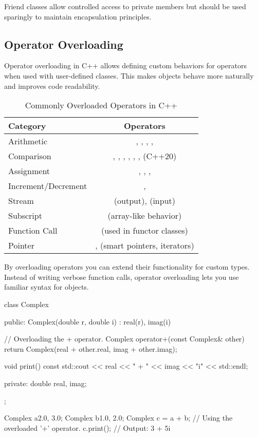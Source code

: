 Friend classes allow controlled access to private members but should be used sparingly to maintain encapsulation principles.


\subsection{Operator Overloading}

Operator overloading in C++ allows defining custom behaviors for operators when used with user-defined classes. This makes objects behave more naturally and improves code readability.

\begin{table}[H]
    \centering
    \setlength{\tabcolsep}{20pt}
    \begin{tabulary}{\linewidth}{@{} L C @{}}
        \toprule
        \hfill \textbf{Category} \hfill & \textbf{Operators} \\
        \midrule
        Arithmetic & \plaintt{+}, \plaintt{-}, \plaintt{*}, \plaintt{/}, \plaintt{\%} \\
        Comparison & \plaintt{==}, \plaintt{!=}, \plaintt{<}, \plaintt{>}, \plaintt{<=}, \plaintt{>=}, \plaintt{<=>} (C++20) \\
        Assignment & \plaintt{=}, \plaintt{+=}, \plaintt{-=}, \plaintt{*=} \\
        Increment/Decrement & \plaintt{++}, \plaintt{--} \\
        Stream & \plaintt{<<} (output), \plaintt{>>} (input) \\
        Subscript & \plaintt{[]} (array-like behavior) \\
        Function Call & \plaintt{()} (used in functor classes) \\
        Pointer & \plaintt{->}, \plaintt{*} (smart pointers, iterators) \\
        \bottomrule
    \end{tabulary}
    \caption{Commonly Overloaded Operators in C++}
\end{table}

\newpage

By overloading operators you can extend their functionality for custom types. Instead of writing verbose function calls, operator overloading lets you use familiar syntax for objects.

\begin{exampleblock}
\begin{codeblock}[language=C++, numbers=none]
class Complex {
public:
    Complex(double r, double i) : real(r), imag(i) {}

    // Overloading the + operator.
    Complex operator+(const Complex& other) {
        return Complex(real + other.real, imag + other.imag);
    }

    void print() const {
        std::cout << real << " + " << imag << "i" << std::endl;
    }

private:
    double real, imag;
};

Complex a{2.0, 3.0};
Complex b{1.0, 2.0};
Complex c = a + b; // Using the overloaded '+' operator.
c.print(); // Output: 3 + 5i
\end{codeblock}
\end{exampleblock}

